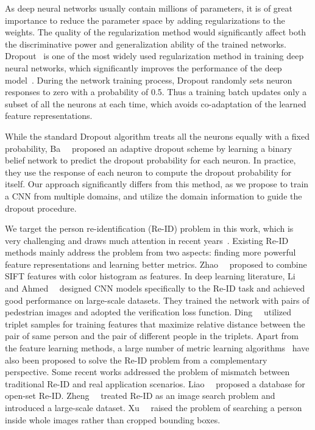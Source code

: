 As deep neural networks usually contain millions of parameters, it is of great importance to reduce the parameter space by adding regularizations to the weights. The quality of the regularization method would significantly affect both the discriminative power and generalization ability of the trained networks. Dropout~\cite{hinton2012improving} is one of the most widely used regularization method in training deep neural networks, which significantly improves the performance of the deep model~\cite{krizhevsky2012imagenet}. During the network training process, Dropout randomly sets neuron responses to zero with a probability of 0.5. Thus a training batch updates only a subset of all the neurons at each time, which avoids co-adaptation of the learned feature representations.

While the standard Dropout algorithm treats all the neurons equally with a fixed probability, Ba~\etal~\cite{ba2013adaptive} proposed an adaptive dropout scheme by learning a binary belief network to predict the dropout probability for each neuron. In practice, they use the response of each neuron to compute the dropout probability for itself. Our approach significantly differs from this method, as we propose to train a CNN from multiple domains, and utilize the domain information to guide the dropout procedure.

We target the person re-identification (Re-ID) problem in this work, which is very challenging and draws much attention in recent years~\cite{wang2007shape,li2015locality,zhang2015bit,xu2013human,liu2014fly,li2015multi}. Existing Re-ID methods mainly address the problem from two aspects: finding more powerful feature representations and learning better metrics. Zhao~\etal~\cite{zhao2013unsupervised,zhao2013person,zhao2014learning} proposed to combine SIFT features with color histogram as features. In deep learning literature, Li~\etal~\cite{li2014deepreid} and Ahmed~\etal~\cite{ahmed2015improved} designed CNN models specifically to the Re-ID task and achieved good performance on large-scale datasets. They trained the network with pairs of pedestrian images and adopted the verification loss function. Ding~\etal~\cite{ding2015deep} utilized triplet samples for training features that maximize relative distance between the pair of same person and the pair of different people in the triplets. Apart from the feature learning methods, a large number of metric learning algorithms~\cite{paisitkriangkrai2015learning,weinberger2005distance,xiong2014person,davis2007information,mcfee2010metric,koestinger2012large} have also been proposed to solve the Re-ID problem from a complementary perspective. Some recent works addressed the problem of mismatch between traditional Re-ID and real application scenarios. Liao~\etal~\cite{liao2014open} proposed a database for open-set Re-ID. Zheng~\etal~\cite{zheng2015scalable} treated Re-ID as an image search problem and introduced a large-scale dataset. Xu~\etal~\cite{xu2014person} raised the problem of searching a person inside whole images rather than cropped bounding boxes.

